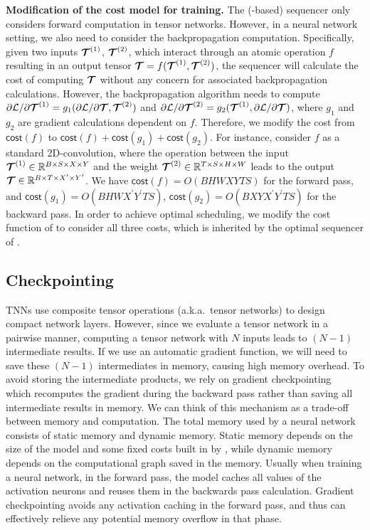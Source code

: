 \textbf{Modification of the cost model for training.} 
The (\netcon-based) \opteinsum sequencer only considers forward computation in tensor networks. 
However, in a neural network setting, we also need to consider the backpropagation computation. Specifically, given two inputs $\bm{\mathcal{T}}^{(1)}$, $\bm{\mathcal{T}}^{(2)}$, which interact through an atomic operation $f$ resulting in an output tensor $\bm{\mathcal{T}}=f(\bm{\mathcal{T}}^{(1)},\bm{\mathcal{T}}^{(2)})$, the \opteinsum sequencer will calculate the cost of computing $\bm{\mathcal{T}}$ without any concern for associated backpropagation calculations. However, the backpropagation algorithm needs to compute ${\partial \mathcal{L}}/{\partial \bm{\mathcal{T}}^{(1)}} = g_1({\partial \mathcal{L}}/ {\partial \bm{\mathcal{T}}}, \bm{\mathcal{T}}^{(2)})$ and ${\partial \mathcal{L}} / {\partial \bm{\mathcal{T}}^{(2)}} = g_2(\bm{\mathcal{T}}^{(1)}, {\partial \mathcal{L}} / {\partial \bm{\mathcal{T}}})$, where $g_1$ and $g_2$ are gradient calculations dependent on $f$. Therefore, we modify the cost from $\textsf{cost}(f)$ to $\textsf{cost}(f) + \textsf{cost}(g_1) + \textsf{cost}(g_2)$.
For instance, consider $f$ as a standard 2D-convolution, where the operation between the input $\bm{\mathcal{T}}^{(1)} \in \mathbb{R}^{B \times S \times X \times Y}$ and the weight $\bm{\mathcal{T}}^{(2)} \in \mathbb{R}^{T \times S \times H \times W}$ leads to the output $\bm{\mathcal{T}} \in \mathbb{R}^{B \times T \times X^\prime \times Y^\prime}$. We have $\textsf{cost}(f) = O(BHWXYTS)$ for the forward pass, and $\textsf{cost}(g_1) = O(B HW X^\prime Y^\prime TS)$, $\textsf{cost}(g_2) = O(B XY X^\prime Y^\prime TS)$ for the backward pass. In order to achieve optimal scheduling, we modify the cost function of \opteinsum to consider all three costs, which is inherited by the optimal sequencer of \conveinsum.

\subsection{Checkpointing}
\label{sub:algorithms-checkpointing}

TNNs use composite tensor operations (a.k.a.\ tensor networks) to design compact network layers. However, since we evaluate a tensor network in a pairwise manner, computing a tensor network with $N$ inputs leads to $(N - 1)$ intermediate results. If we use an automatic gradient function, we will need to save these $(N - 1)$ intermediates in memory, causing high memory overhead.
To avoid storing the intermediate products, we rely on gradient checkpointing~\citep{chen2016training}
which recomputes the gradient during the backward pass rather than saving all intermediate results in memory. We can think of this mechanism as a trade-off between memory and computation. The total memory used by a neural network consists of static memory and dynamic memory. Static memory depends on the size of the model and some fixed costs built in by \pytorch, while dynamic memory depends on the computational graph saved in the memory. Usually when training a neural network, in the forward pass, the model caches all values of the activation neurons and reuses them in the backwards pass calculation. Gradient checkpointing avoids any activation caching in the forward pass, and thus can effectively relieve any potential memory overflow in that phase.